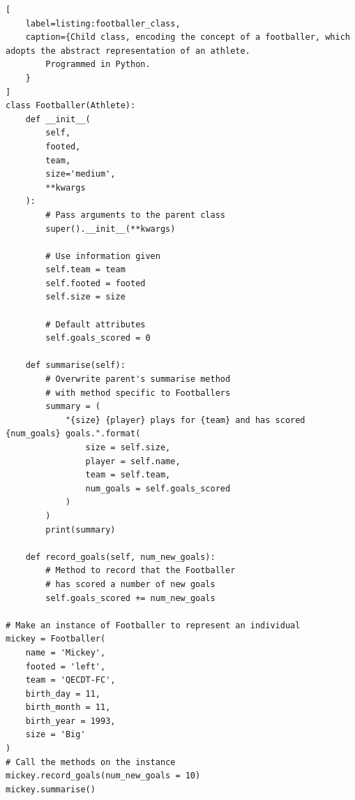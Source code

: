 \begin{lstlisting}[
    label=listing:footballer_class,
    caption={Child class, encoding the concept of a footballer, which adopts the abstract representation of an athlete. 
        Programmed in Python.
    }
]
class Footballer(Athlete):
    def __init__(
        self, 
        footed,
        team, 
        size='medium',
        **kwargs
    ):
        # Pass arguments to the parent class
        super().__init__(**kwargs)
        
        # Use information given
        self.team = team
        self.footed = footed
        self.size = size
        
        # Default attributes
        self.goals_scored = 0 

    def summarise(self):
        # Overwrite parent's summarise method
        # with method specific to Footballers
        summary = ( 
            "{size} {player} plays for {team} and has scored {num_goals} goals.".format(
                size = self.size, 
                player = self.name, 
                team = self.team, 
                num_goals = self.goals_scored
            )
        )
        print(summary)
        
    def record_goals(self, num_new_goals):
        # Method to record that the Footballer 
        # has scored a number of new goals
        self.goals_scored += num_new_goals
        
# Make an instance of Footballer to represent an individual
mickey = Footballer(
    name = 'Mickey', 
    footed = 'left',
    team = 'QECDT-FC',
    birth_day = 11,
    birth_month = 11, 
    birth_year = 1993,
    size = 'Big'
)
# Call the methods on the instance
mickey.record_goals(num_new_goals = 10)
mickey.summarise()    
\end{lstlisting}

